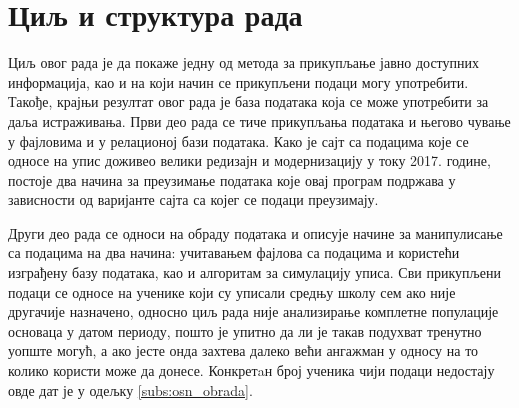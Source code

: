 \section{Циљ и структура рада}

Циљ овог рада је да покаже једну од метода за прикупљање јавно доступних информација, као и на који начин се прикупљени подаци могу употребити. Такође, крајњи резултат овог рада је база података која се може употребити за даља истраживања. Први део рада се тиче прикупљања података и његово чување у фајловима и у релационој бази података. Како је сајт са подацима које се односе на упис доживео велики редизајн и модернизацију у току 2017. године, постоје два начина за преузимање података које овај програм подржава у зависности од варијанте сајта са којег се подаци преузимају. 

Други део рада се односи на обраду података и описује начине за манипулисање са подацима на два начина: учитавањем фајлова са подацима и користећи изграђену базу података, као и алгоритам за симулацију уписа. Сви прикупљени подаци се односе на ученике који су уписали средњу школу сем ако није другачије назначено, односно циљ рада није анализирање комплетне популације основаца у датом периоду, пошто је упитно да ли је такав подухват тренутно уопште могућ, а ако јесте онда захтева далеко већи ангажман у односу на то колико користи може да донесе. Конкретaн број ученика чији подаци недостају овде дат је у одељку \ref{subs:osn_obrada}.